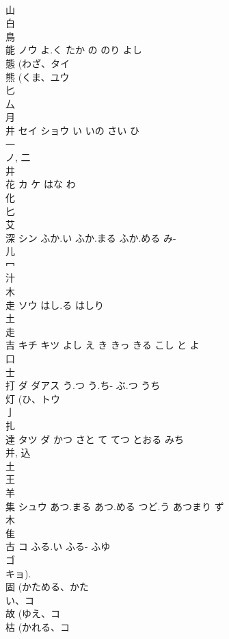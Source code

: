 \documentclass[8pt]{extreport}
\begin{document}
\begin{CJK}{UTF8}{min}
\\	山 
\\	白 
\\	鳥 
\\	能	ノウ	よ.く たか の のり よし	
\\	態 (わざ、タイ 
\\	熊 (くま、ユウ 
\\	匕 
\\	厶 
\\	月 
\\	井	セイ ショウ	い いの さい ひ	
\\	一 
\\	ノ, 二 
\\	井 
\\	花	カ ケ	はな わ	
\\	化 
\\	匕 
\\	艾 
\\	深	シン	ふか.い ふか.まる ふか.める み-	
\\	儿 
\\	冖 
\\	汁 
\\	木 
\\	走	ソウ	はし.る はしり	
\\	土 
\\	走 
\\	吉	キチ キツ	よし え き きっ きる こし と よ	
\\	口 
\\	士 
\\	打	ダ ダアス	う.つ う.ち- ぶ.つ うち	
\\	灯 (ひ、トウ 
\\	亅 
\\	扎	
\\	達	タツ ダ	かつ さと て てつ とおる みち	
\\	并, 込 
\\	土 
\\	王 
\\	羊 
\\	集	シュウ	あつ.まる あつ.める つど.う あつまり ず	
\\	木 
\\	隹 
\\	古	コ	ふる.い ふる- ふゆ	
\\	ゴ 
\\	キョ). 
\\	固 (かためる、かた
\\	い、コ 
\\	故 (ゆえ、コ 
\\	枯 (かれる、コ 

\end{CJK}
\end{document}
